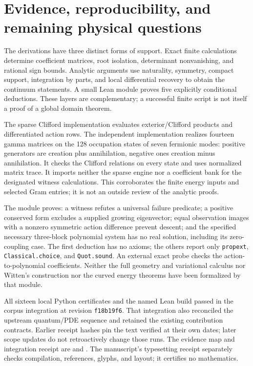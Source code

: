 \section{Evidence, reproducibility, and remaining physical questions}
\label{sec:verification}

The derivations have three distinct forms of support. Exact finite
calculations determine coefficient matrices, root isolation, determinant
nonvanishing, and rational sign bounds. Analytic arguments use naturality,
symmetry, compact support, integration by parts, and local differential
recovery to obtain the continuum statements. A small Lean module proves
five explicitly conditional deductions. These layers are complementary;
a successful finite script is not itself a proof of a global domain theorem.

The sparse Clifford implementation evaluates exterior/Clifford products
and differentiated action rows. The independent implementation realizes
fourteen gamma matrices on the 128 occupation states of seven fermionic
modes: positive generators are creation plus annihilation, negative ones
creation minus annihilation. It checks the Clifford relations on every
state and uses normalized matrix trace. It imports neither the sparse
engine nor a coefficient bank for the designated witness calculations.
This corroborates the finite energy inputs and selected Gram entries;
it is not an outside review of the analytic proofs.

The module 
proves: a witness refutes a universal failure predicate; a positive
conserved form excludes a supplied growing eigenvector; equal observation
images with a nonzero symmetric action difference prevent descent; and
the specified necessary three-block polynomial system has no real solution,
including its zero-coupling case. The first deduction has no axioms;
the others report only \texttt{propext}, \texttt{Classical.choice}, and
\texttt{Quot.sound}. An external exact probe checks the action-to-polynomial
coefficients. Neither the full geometry and variational calculus nor
Witten's construction nor the curved energy theorems have been formalized
by that module.

All sixteen local Python certificates and the named Lean build passed
in the corpus integration at revision \texttt{f18b19f6}.
That integration also reconciled the upstream quantum/PDE sequence and
retained the existing contribution contracts. Earlier receipt hashes pin
the text verified at their own dates; later scope updates do not
retroactively change those runs. The evidence map and integration receipt
are  and
.
The manuscript's typesetting receipt separately checks compilation,
references, glyphs, and layout; it certifies no mathematics.

